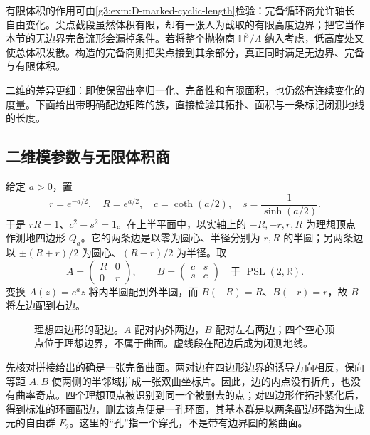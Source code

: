 \ProseParagraphBreak
有限体积的作用可由\cref{g3:exm:D-marked-cyclic-length}检验：完备循环商允许轴长自由变化。尖点截段虽然体积有限，却有一张人为截取的有限高度边界；把它当作本节的无边界完备流形会漏掉条件。若将整个抛物商 \(\mathbb H^3/\Lambda\) 纳入考虑，低高度处又使总体积发散。构造的完备商则把尖点接到其余部分，真正同时满足无边界、完备与有限体积。

\ProseParagraphBreak
二维的差异更细：即使保留曲率归一化、完备性和有限面积，也仍然有连续变化的度量。下面给出带明确配边矩阵的族，直接检验其拓扑、面积与一条标记闭测地线的长度。

\subsection{二维模参数与无限体积商}
\label{g3:subsec:D05:04}

\begin{example}\label{g3:exm:D-punctured-torus-family}
	给定 \(a>0\)，置
	\[
		r=e^{-a/2},\quad R=e^{a/2},\quad
		c=\coth(a/2),\quad s=\frac1{\sinh(a/2)}.
	\]
	于是 \(rR=1\)、\(c^2-s^2=1\)。在上半平面中，以实轴上的
	\(-R,-r,r,R\) 为理想顶点作测地四边形 \(Q_a\)。它的两条边是以零为圆心、半径分别为 \(r,R\) 的半圆；另两条边以 \(\pm(R+r)/2\) 为圆心、\((R-r)/2\) 为半径。取
	\[
		A=\begin{pmatrix}R&0\\0&r\end{pmatrix},\qquad
		B=\begin{pmatrix}c&s\\s&c\end{pmatrix}
		\quad\text{于 }\operatorname{PSL}(2,\mathbb R).
	\]
	变换 \(A(z)=e^az\) 将内半圆配到外半圆，而
	\(B(-R)=R\)、\(B(-r)=r\)，故 \(B\) 将左边配到右边。
\end{example}

\begin{figure}[htbp]
	\centering
	
	\caption{理想四边形的配边。\(A\) 配对内外两边，\(B\) 配对左右两边；四个空心顶点位于理想边界，不属于曲面。虚线段在配边后成为闭测地线。}
	\label{g3:fig:D-ideal-quadrilateral}
\end{figure}

先核对拼接给出的确是一张完备曲面。两对边在四边形边界的诱导方向相反，保向等距 \(A,B\) 使两侧的半邻域拼成一张双曲坐标片。因此，边的内点没有折角，也没有曲率奇点。四个理想顶点被识别到同一个被删去的点；对四边形作拓扑紧化后，得到标准的环面配边，删去该点便是一孔环面，其基本群是以两条配边环路为生成元的自由群 \(F_2\)。这里的“孔”指一个穿孔，不是带有边界圆的紧曲面。

